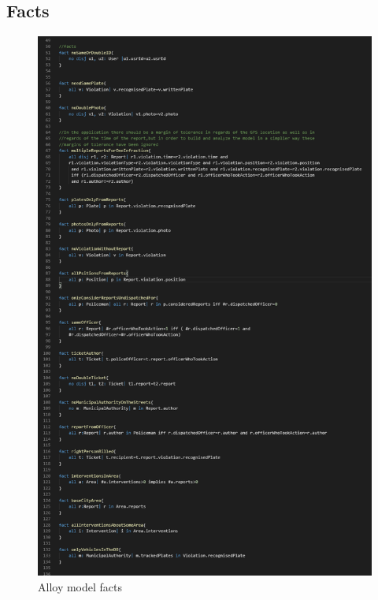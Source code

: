 \subsection{Facts}
\begin{figure}[h!]
	\includegraphics[scale=0.58]{Images/Facts_1-2}
	\caption{Alloy model facts}
\end{figure}
\newpage
